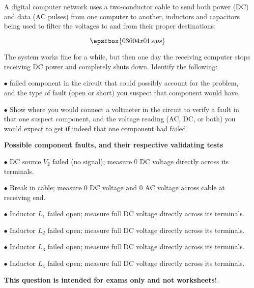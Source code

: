 

A digital computer network uses a two-conductor cable to send both power (DC) and data (AC pulses) from one computer to another, inductors and capacitors being used to filter the voltages to and from their proper destinations:

$$\epsfbox{03604x01.eps}$$

The system works fine for a while, but then one day the receiving computer stops receiving DC power and completely shuts down.  Identify the following:

\vskip 10pt

\medskip
\item{$\bullet$}  failed component in the circuit that could possibly account for the problem, and the type of fault (open or short) you suspect that component would have.
\vskip 40pt
\item{$\bullet$} Show where you would connect a voltmeter in the circuit to verify a fault in that one suspect component, and the voltage reading (AC, DC, or both) you would expect to get if indeed that one component had failed.
\medskip







\goodbreak
\noindent
{\bf Possible component faults, and their respective validating tests}

\medskip
\item{$\bullet$} DC source $V_2$ failed (no signal); measure 0 DC voltage directly across its terminals.
\item{$\bullet$} Break in cable; measure 0 DC voltage and 0 AC voltage across cable at receiving end.
\item{$\bullet$} Inductor $L_1$ failed open; measure full DC voltage directly across its terminals.
\item{$\bullet$} Inductor $L_2$ failed open; measure full DC voltage directly across its terminals.
\item{$\bullet$} Inductor $L_3$ failed open; measure full DC voltage directly across its terminals.
\item{$\bullet$} Inductor $L_4$ failed open; measure full DC voltage directly across its terminals.
\medskip







{\bf This question is intended for exams only and not worksheets!}.



